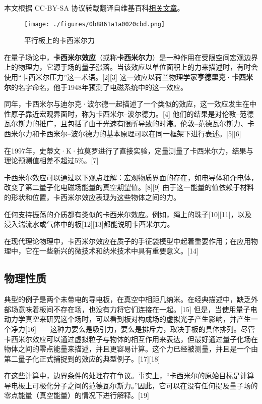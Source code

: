 
本文根据 CC-BY-SA 协议转载翻译自维基百科\href{https://en.wikipedia.org/wiki/Casimir_effect}{相关文章}。

\begin{figure}[ht]
\centering
\texttt{[image: ./figures/0b8861a1a0020cbd.png]}
\caption{平行板上的卡西米尔力} \label{fig_KMXR_1}
\end{figure}
在量子场论中，\textbf{卡西米尔效应}（或称\textbf{卡西米尔力}）是一种作用在受限空间宏观边界上的物理力，它源于场的量子涨落。当该效应以单位面积上的力来描述时，有时会使用“卡西米尔压力”这一术语。[2][3] 这一效应以荷兰物理学家\textbf{亨德里克·卡西米尔}的名字命名，他于1948年预测了电磁系统中的这一效应。

同年，卡西米尔与迪尔克·波尔德一起描述了一个类似的效应，这一效应发生在中性原子靠近宏观界面时，称为卡西米尔–波尔德力。[4] 他们的结果是对伦敦–范德瓦尔斯力的推广，且包括了由于光速有限所导致的时滞。伦敦–范德瓦尔斯力、卡西米尔力和卡西米尔–波尔德力的基本原理可以在同一框架下进行表述。[5][6]

在1997年，史蒂文·K·拉莫罗进行了直接实验，定量测量了卡西米尔力，结果与理论预测值相差不超过5\%。[7]

卡西米尔效应可以通过以下观点理解：宏观物质界面的存在，如电导体和介电体，改变了第二量子化电磁场能量的真空期望值。[8][9] 由于这一能量的值依赖于材料的形状和位置，卡西米尔效应表现为这些物体之间的力。

任何支持振荡的介质都有类似的卡西米尔效应。例如，绳上的珠子[10][11]，以及浸入湍流水或气体中的板[12][13]都能说明卡西米尔力。

在现代理论物理中，卡西米尔效应在质子的手征袋模型中起着重要作用；在应用物理中，它在一些新兴的微技术和纳米技术中具有重要意义。[14]
\subsection{物理性质}
典型的例子是两个未带电的导电板，在真空中相距几纳米。在经典描述中，缺乏外部场意味着板间不存在场，也没有力将它们连接在一起。[15] 但是，当使用量子电动力学真空来研究这个场时，可以看到板对构成场的虚拟光子产生影响，并产生一个净力[16]——这种力要么是吸引力，要么是排斥力，取决于板的具体排列。尽管卡西米尔效应可以通过虚拟粒子与物体的相互作用来表达，但最好通过量子化场在物体之间的零点能量来描述，并且更容易计算。这个力已经被测量，并且是一个由第二量子化正式捕捉到的效应的典型例子。[17][18]

在这些计算中，边界条件的处理存在争议。事实上，“卡西米尔的原始目标是计算导电板上可极化分子之间的范德瓦尔斯力。”因此，它可以在没有任何提及量子场的零点能量（真空能量）的情况下进行解释。[19]

